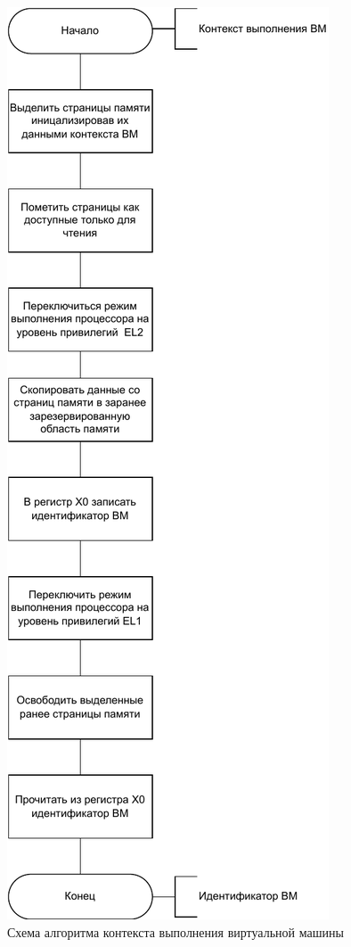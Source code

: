 \begin{figure}[h]
	\centering
	\includegraphics[scale=0.6]{img/save-context-algo.pdf}
	\caption{Схема алгоритма контекста выполнения виртуальной машины}
	\label{fig:save-context-algo}
\end{figure}

